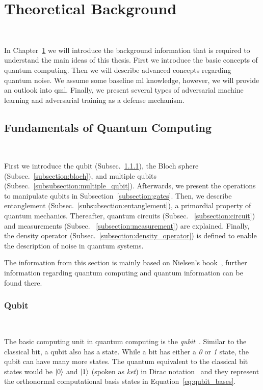 \chapter{Theoretical Background}\label{chapter:background} \

In Chapter~\ref{chapter:background} we will introduce the
background information that is required to understand
the main ideas of this thesis. First we introduce
the basic concepts of quantum computing. Then we will
describe advanced concepts regarding quantum noise. We
assume some baseline \ac{ml} knowledge, however, we
will provide an outlook into \ac{qml}. Finally, we
present several types of adversarial machine learning
and adversarial training as a defense mechanism. \

\section{Fundamentals of Quantum Computing} \

First we introduce the qubit (Subsec.~\ref{subsection:qubit}),
the Bloch sphere (Subsec.~\ref{subsection:bloch}), and
multiple qubits (Subsec.~\ref{subsubsection:multiple_qubit}).
Afterwards, we present the operations to manipulate qubits in 
Subsection~\ref{subsection:gates}. Then, we describe entanglement
(Subsec.~\ref{subsubsection:entanglement}), a primordial
property of quantum mechanics. Thereafter, quantum circuits (Subsec.
~\ref{subsection:circuit}) and measurements (Subsec.
~\ref{subsection:measurement}) are explained. Finally, the
density operator (Subsec.~\ref{subsection:density_operator})
is defined to enable the description of noise in quantum systems. \

The information from this section is mainly based on Nielsen's
book~\cite{nielsen_quantum_2010}, further information regarding
quantum computing and quantum information can be found there. \

\subsection{Qubit}\label{subsection:qubit} \

The basic computing unit in quantum computing is the
\textit{qubit}~\cite{schumacher_quantum_1995}. Similar to the classical
bit, a qubit also has a state. While a bit has either a
\textit{0} or \textit{1} state, the qubit can have
many more states. The quantum equivalent to the classical
bit states would be \(\ket{0}\) and \(\ket{1}\) (spoken as \textit{ket}) in Dirac
notation~\cite{dirac_new_1939} and they represent the orthonormal computational
basis states in Equation~\ref{eq:qubit_bases}. \

